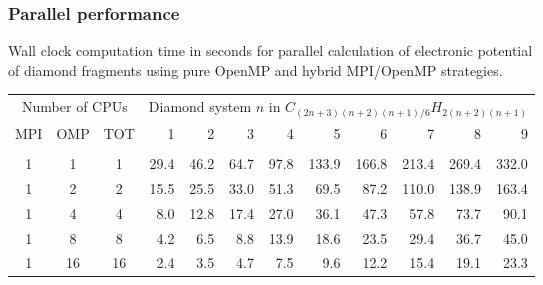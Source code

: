 \begin{frame}
    \frametitle{Parallel performance}
    \scriptsize
    \centering
    Wall clock computation time in seconds for parallel calculation of electronic potential\\
    of diamond fragments using pure OpenMP and hybrid MPI/OpenMP strategies.\\
    \begin{table}
    \tiny
    \begin{tabular}{cccrrrrrrrrr}
	\hline
	\hline                                                                           
	\multicolumn{3}{c}{Number of CPUs}&
	\multicolumn{9}{c}{Diamond system $n$ in $C_{(2n+3)(n+2)(n+1)/6}H_{2(n+2)(n+1)}$}\\
	MPI&OMP&TOT	&1	&2	&3	&4	&5	&6	&7	&8	&9	\\
	\hline
	   &   &   	&	&      	&	&	&	&	&	&	&	\\
	  1&  1&  1	& 29.4	& 46.2 	& 64.7 	& 97.8  &133.9  &166.8  &213.4  &269.4  &332.0  \\
	  1&  2&  2	& 15.5	& 25.5 	& 33.0 	& 51.3  & 69.5  & 87.2  &110.0  &138.9  &163.4  \\
	  1&  4&  4	&  8.0 	& 12.8 	& 17.4 	& 27.0  & 36.1  & 47.3  & 57.8  & 73.7  & 90.1  \\
	  1&  8&  8	&  4.2 	&  6.5 	&  8.8 	& 13.9  & 18.6  & 23.5  & 29.4  & 36.7  & 45.0  \\
	  1& 16& 16	&  2.4 	&  3.5 	&  4.7 	&  7.5  &  9.6  & 12.2  & 15.4  & 19.1  & 23.3  \\

\end{tabular}
\end{table}
\end{frame}
